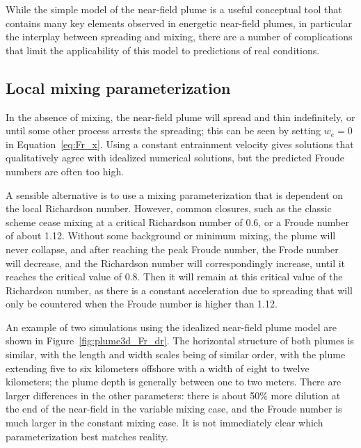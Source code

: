 \documentclass[12pt]{article}
\begin{document}
While the simple model of the near-field plume is a useful conceptual tool that contains many key elements observed in energetic near-field plumes, in particular the interplay between spreading and mixing, there are a number of complications that limit the applicability of this model to predictions of real conditions.

\subsection{Local mixing parameterization}

In the absence of mixing, the near-field plume will spread and thin indefinitely, or until some other process arrests the spreading; this can be seen by setting $w_e=0$ in Equation~\ref{eq:Fr_x}. Using a constant entrainment velocity gives solutions that qualitatively agree with idealized numerical solutions, but the predicted Froude numbers are often too high. 

A sensible alternative is to use a mixing parameterization that is dependent on the local Richardson number. However, common closures, such as the classic \citet{ellison.turner:59} scheme cease mixing at a critical Richardson number of 0.6, or a Froude number of about 1.12. Without some background or minimum mixing, the plume will never collapse, and after reaching the peak Froude number, the Frode number will decrease, and the Richardson number will correspondingly increase, until it reaches the critical value of 0.8. Then it will remain at this critical value of the Richardson number, as there is a constant acceleration due to spreading that will only be countered when the Froude number is higher than 1.12.

An example of two simulations using the idealized near-field plume model are shown in Figure~\ref{fig:plume3d_Fr_dr}. The horizontal structure of both plumes is similar, with the length and width scales being of similar order, with the plume extending five to six kilometers offshore with a width of eight to twelve kilometers; the plume depth is generally between one to two meters. There are larger differences in the other parameters: there is about 50\% more dilution at the end of the near-field in the variable mixing case, and the Froude number is much larger in the constant mixing case. It is not immediately clear which parameterization best matches reality.
\end{document}
